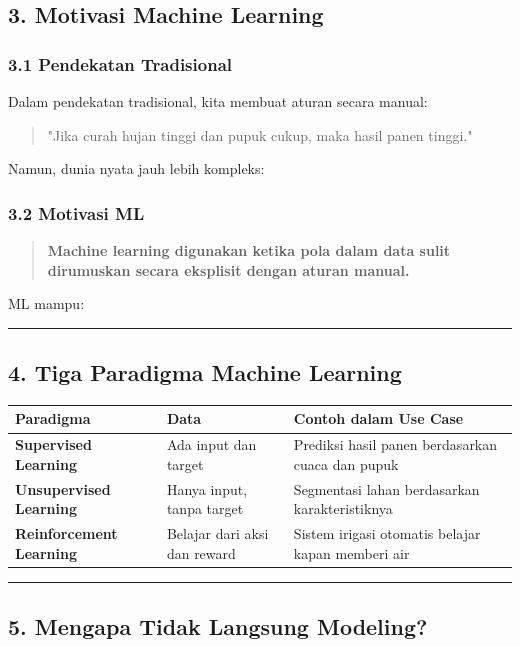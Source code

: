 \documentclass[12pt,a4paper]{article}
\begin{document}
\subsection{3. Motivasi Machine Learning}

\subsubsection{3.1 Pendekatan Tradisional}

Dalam pendekatan tradisional, kita membuat aturan secara manual:


\begin{quote}
"Jika curah hujan tinggi dan pupuk cukup, maka hasil panen tinggi."\end{quote}


Namun, dunia nyata jauh lebih kompleks:


\subsubsection{3.2 Motivasi ML}

\begin{quote}
\textbf{Machine learning digunakan ketika pola dalam data sulit dirumuskan secara eksplisit dengan aturan manual.}\end{quote}


ML mampu:


\hrule


\subsection{4. Tiga Paradigma Machine Learning}

\begin{tabular}{|l|l|l|}
\hline
Paradigma & Data & Contoh dalam Use Case \\
\hline
\textbf{Supervised Learning} & Ada input dan target & Prediksi hasil panen berdasarkan cuaca dan pupuk \\
\hline
\textbf{Unsupervised Learning} & Hanya input, tanpa target & Segmentasi lahan berdasarkan karakteristiknya \\
\hline
\textbf{Reinforcement Learning} & Belajar dari aksi dan reward & Sistem irigasi otomatis belajar kapan memberi air \\
\hline
\end{tabular}


\hrule


\subsection{5. Mengapa Tidak Langsung Modeling?}
\end{document}

